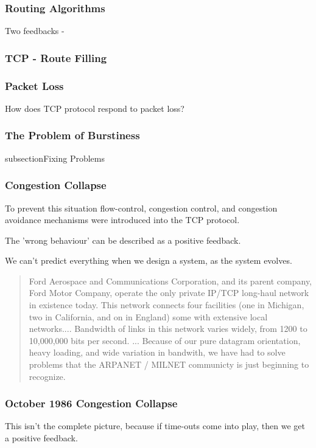 \subsubsection{Routing Algorithms}

Two feedbacks - 

\subsubsection{TCP - Route Filling}

\subsubsection{Packet Loss}

How does TCP protocol respond to packet loss?

\subsubsection{The Problem of Burstiness} 

subsection{Fixing Problems}

\subsubsection{Congestion Collapse}




To prevent this situation flow-control, congestion control, and congestion avoidance mechanisms were
introduced into the TCP protocol.

The 'wrong behaviour' can be described as a positive feedback.


We can't predict everything when we design a system, as the system evolves.

\begin{quote}
Ford Aerospace and Communications Corporation, and its parent company, Ford Motor Company, operate
    the only private IP/TCP long-haul network in existence today. This network connects four
    facilities (one in Michigan, two in California, and on in England) some with extensive local
    networks.... Bandwidth of links in this network varies widely, from 1200 to 10,000,000 bits per
    second. ... Because of our pure datagram orientation, heavy loading, and wide variation in
    bandwith, we have had to solve problems that the ARPANET / MILNET communicty is just beginning
    to recognize.
\end{quote}

\subsubsection{October 1986 Congestion Collapse}


This isn't the complete picture, because if time-outs come into play, then we get a positive
feedback.




